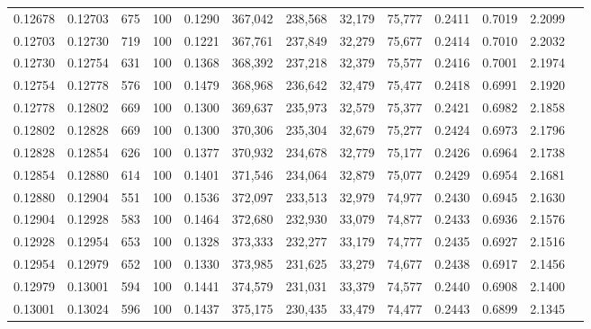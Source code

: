 \begin{tabular}{rrrrrrrrrrrrr}
0.12678 & 0.12703 &   675 & 100 &                                     0.1290 & 367,042 & 238,568 &  32,179 &  75,777 & 0.2411 & 0.7019 & 2.2099 \\
0.12703 & 0.12730 &   719 & 100 &                                     0.1221 & 367,761 & 237,849 &  32,279 &  75,677 & 0.2414 & 0.7010 & 2.2032 \\
0.12730 & 0.12754 &   631 & 100 &                                     0.1368 & 368,392 & 237,218 &  32,379 &  75,577 & 0.2416 & 0.7001 & 2.1974 \\
0.12754 & 0.12778 &   576 & 100 &                                     0.1479 & 368,968 & 236,642 &  32,479 &  75,477 & 0.2418 & 0.6991 & 2.1920 \\
0.12778 & 0.12802 &   669 & 100 &                                     0.1300 & 369,637 & 235,973 &  32,579 &  75,377 & 0.2421 & 0.6982 & 2.1858 \\
0.12802 & 0.12828 &   669 & 100 &                                     0.1300 & 370,306 & 235,304 &  32,679 &  75,277 & 0.2424 & 0.6973 & 2.1796 \\
0.12828 & 0.12854 &   626 & 100 &                                     0.1377 & 370,932 & 234,678 &  32,779 &  75,177 & 0.2426 & 0.6964 & 2.1738 \\
0.12854 & 0.12880 &   614 & 100 &                                     0.1401 & 371,546 & 234,064 &  32,879 &  75,077 & 0.2429 & 0.6954 & 2.1681 \\
0.12880 & 0.12904 &   551 & 100 &                                     0.1536 & 372,097 & 233,513 &  32,979 &  74,977 & 0.2430 & 0.6945 & 2.1630 \\
0.12904 & 0.12928 &   583 & 100 &                                     0.1464 & 372,680 & 232,930 &  33,079 &  74,877 & 0.2433 & 0.6936 & 2.1576 \\
0.12928 & 0.12954 &   653 & 100 &                                     0.1328 & 373,333 & 232,277 &  33,179 &  74,777 & 0.2435 & 0.6927 & 2.1516 \\
0.12954 & 0.12979 &   652 & 100 &                                     0.1330 & 373,985 & 231,625 &  33,279 &  74,677 & 0.2438 & 0.6917 & 2.1456 \\
0.12979 & 0.13001 &   594 & 100 &                                     0.1441 & 374,579 & 231,031 &  33,379 &  74,577 & 0.2440 & 0.6908 & 2.1400 \\
0.13001 & 0.13024 &   596 & 100 &                                     0.1437 & 375,175 & 230,435 &  33,479 &  74,477 & 0.2443 & 0.6899 & 2.1345 \\

\end{tabular}
